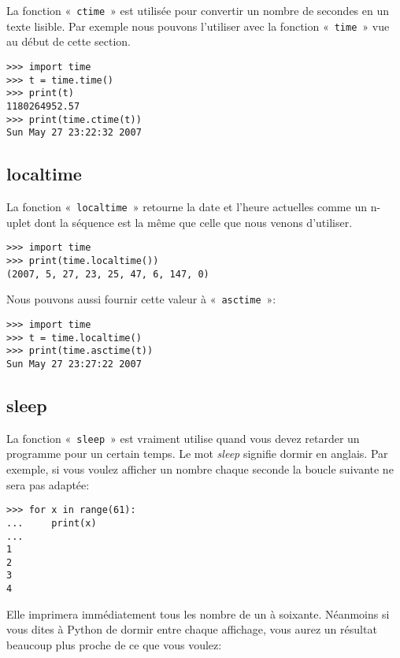 La fonction « \texttt{ctime} » est utilisée pour convertir un nombre de secondes en un texte lisible.  Par exemple nous pouvons l'utiliser avec la fonction « \texttt{time} » vue au début de cette section.

\begin{Verbatim}[frame=single,rulecolor=\color{gray}]
>>> import time
>>> t = time.time()
>>> print(t)
1180264952.57
>>> print(time.ctime(t))
Sun May 27 23:22:32 2007
\end{Verbatim}


\subsection{localtime}

La fonction « \texttt{localtime} » retourne la date et l'heure actuelles comme un n-uplet dont la séquence est la même que celle que nous venons d'utiliser. 

\begin{Verbatim}[frame=single,rulecolor=\color{gray}]
>>> import time
>>> print(time.localtime())
(2007, 5, 27, 23, 25, 47, 6, 147, 0)
\end{Verbatim}


Nous pouvons aussi fournir cette valeur à « \texttt{asctime} »:

\begin{Verbatim}[frame=single,rulecolor=\color{gray}]
>>> import time
>>> t = time.localtime()
>>> print(time.asctime(t))
Sun May 27 23:27:22 2007
\end{Verbatim}

\subsection{sleep}

La fonction « \texttt{sleep} » est vraiment utilise quand vous devez retarder un programme pour un certain temps. Le mot \emph{sleep} signifie dormir en anglais. Par exemple, si vous voulez afficher un nombre chaque seconde la boucle suivante ne sera pas adaptée:

\begin{Verbatim}[frame=single,rulecolor=\color{gray}]
>>> for x in range(61):
...     print(x)
...
1
2
3
4
\end{Verbatim}

Elle imprimera immédiatement tous les nombre de un à soixante. Néanmoins si vous dites à Python de dormir entre chaque affichage, vous aurez un résultat beaucoup plus proche de ce que vous voulez:

